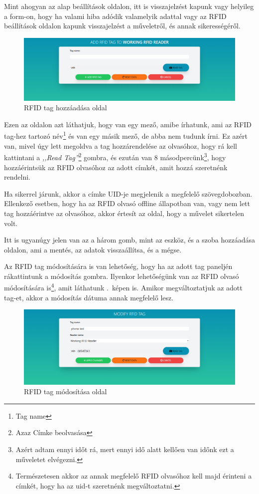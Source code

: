 \documentclass[
]{thesis-ekf}
\theoremstyle{definition}
\theoremstyle{remark}
\begin{document}
	Mint ahogyan az alap beállítások oldalon, itt is visszajelzést kapunk vagy helyileg a form-on, hogy ha valami hiba adódik valamelyik adattal vagy az RFID beállítások oldalon kapunk visszajelzést a műveletről, és annak sikerességéről.
	
	\begin{figure}[ht!]
		\centering
		\includegraphics[width=1\textwidth]{./src/pages_img/add-rfid-tag}
		\caption{RFID tag hozzáadása oldal}
		\label{add-rfid-tag}
	\end{figure}

	Ezen az oldalon azt láthatjuk, hogy van egy mező, amibe írhatunk, ami az RFID tag-hez tartozó név\footnote{Tag name} és van egy másik mező, de abba nem tudunk írni. Ez azért van, mivel úgy lett megoldva a tag hozzárendelése az olvasóhoz, hogy rá kell kattintani a \emph{,,Read Tag''}\footnote{Azaz Címke beolvasása} gombra, és ezután van 8 másodpercünk\footnote{Azért adtam ennyi időt rá, mert ennyi idő alatt kellően van időnk ezt a műveletet elvégezni.}, hogy hozzáérintsük az RFID olvasóhoz az adott címkét, amit hozzá szeretnénk rendelni. 
	
	Ha sikerrel járunk, akkor a címke UID-je megjelenik a megfelelő szövegdobozban. Ellenkező esetben, hogy ha az RFID olvasó offline állapotban van, vagy nem lett tag hozzáérintve az olvasóhoz, akkor értesít az oldal, hogy a művelet sikertelen volt.
	
	Itt is ugyanúgy jelen van az a három gomb, mint az eszköz, és a szoba hozzáadása oldalon, ami a mentés, az adatok visszaállítsa, és a mégse.
	
	Az RFID tag módosítására is van lehetőség, hogy ha az adott tag paneljén rákattintunk a módosítás gombra. Ilyenkor lehetőségünk van az RFID olvasó módosítására is\footnote{Természetesen akkor az annak megfelelő RFID olvasóhoz kell majd érinteni a címkét, hogy ha az uid-t szeretnénk megváltoztatni.}, amit láthatunk .~képen is. Amikor megváltoztatjuk az adott tag-et, akkor a módosítás dátuma annak megfelelő lesz.
	
	\begin{figure}[ht!]
		\centering
		\includegraphics[width=1\textwidth]{./src/pages_img/modify-rfid-tag}
		\caption{RFID tag módosítása oldal}
		\label{modify-rfid-tag}
	\end{figure}
\end{document}
